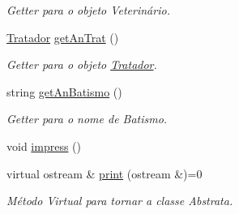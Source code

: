 \begin{DoxyCompactItemize}
\begin{DoxyCompactList}\small\item\em Getter para o objeto Veterinário. \end{DoxyCompactList}\item 
\hyperlink{classTratador}{Tratador} \hyperlink{classAnimal_aac17c7dfee9b147d830a6a920a372e01}{get\+An\+Trat} ()
\begin{DoxyCompactList}\small\item\em Getter para o objeto \hyperlink{classTratador}{Tratador}. \end{DoxyCompactList}\item 
string \hyperlink{classAnimal_a41e1e02b1ee86e60b0490e03531c53b9}{get\+An\+Batismo} ()
\begin{DoxyCompactList}\small\item\em Getter para o nome de Batismo. \end{DoxyCompactList}\item 
void \hyperlink{classAnimal_afd6911459593c12e36e2517e9695f5ba}{impress} ()
\item 
virtual ostream \& \hyperlink{classAnimal_afb840c2d5209cba2e9d33d34bf9f5e3e}{print} (ostream \&)=0
\begin{DoxyCompactList}\small\item\em Método Virtual para tornar a classe Abstrata. \end{DoxyCompactList}\end{DoxyCompactItemize}
